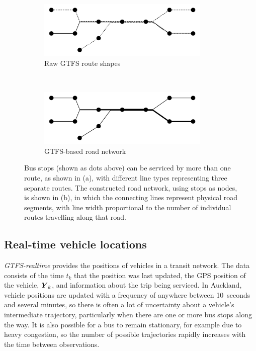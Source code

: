 \begin{figure}[tb]
    \centering
    \begin{subfigure}{0.7\textwidth}
        \centering
        \includegraphics[width=0.9\textwidth]{figures/02_network_segments_1.pdf}
        \caption{Raw GTFS route shapes}
        \label{fig:network_creation_1}
    \end{subfigure} \\
    \begin{subfigure}{0.7\textwidth}
        \centering
        \includegraphics[width=0.9\textwidth]{figures/02_network_segments_2.pdf}
        \caption{GTFS-based road network}
        \label{fig:network_creation_2}
    \end{subfigure}
    \caption{
        Bus stops (shown as dots above) can be serviced by more than one route, 
        as shown in (a), with different line types representing three separate routes.
        The constructed road network, using stops as nodes, is shown in (b),
        in which the connecting lines represent physical road segments,
        with line width proportional to the number of individual routes 
        travelling along that road.
    }
    \label{fig:network_creation}
\end{figure}


\subsection{Real-time vehicle locations}
\label{sec:realtime_data}

\emph{GTFS-realtime} provides the positions of vehicles in a transit network.
The data consists of the time $t_k$ that the position was last updated,
the GPS position of the vehicle, $\mbox{$\boldsymbol{Y}$}_k$, 
and information about the trip being serviced.
In Auckland, vehicle positions are updated with a frequency of anywhere between 10~seconds and several minutes,
so there is often a lot of uncertainty about a vehicle's intermediate trajectory,
particularly when there are one or more bus stops along the way.
It is also possible for a bus to remain stationary,
for example due to heavy congestion,
so the number of possible trajectories rapidly increases with 
the time between observations.


